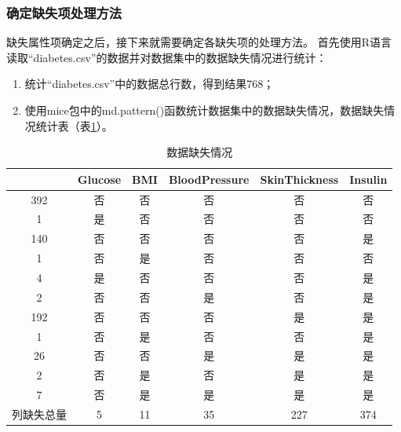 \documentclass[a4paper]{ctexart}
\begin{document}
\subsubsection{确定缺失项处理方法}\label{sec:确定缺失项处理方法}
缺失属性项确定之后，接下来就需要确定各缺失项的处理方法。
首先使用R语言读取“diabetes.csv”的数据并对数据集中的数据缺失情况进行统计：
\begin{enumerate}
	\item 统计“diabetes.csv”中的数据总行数，得到结果768；
	\item 使用mice包中的md.pattern()函数统计数据集中的数据缺失情况，数据缺失情况统计表（表\ref{tab:缺失数据统计}）。
\end{enumerate}
\begin{table}[htbp]
	\centering
	\caption{数据缺失情况}
	\begin{tabular}{|c|ccccc|}
		\hline
		\diagbox{数据点数量}{是否缺失}{列名} & Glucose & BMI & BloodPressure & SkinThickness & Insulin \\\hline
		392                                  & 否      & 否  & 否            & 否            & 否      \\
		1                                    & 是      & 否  & 否            & 否            & 否      \\
		140                                  & 否      & 否  & 否            & 否            & 是      \\
		1                                    & 否      & 是  & 否            & 否            & 否      \\
		4                                    & 是      & 否  & 否            & 否            & 是      \\
		2                                    & 否      & 否  & 是            & 否            & 是      \\
		192                                  & 否      & 否  & 否            & 是            & 是      \\
		1                                    & 否      & 是  & 否            & 否            & 是      \\
		26                                   & 否      & 否  & 是            & 是            & 是      \\
		2                                    & 否      & 是  & 否            & 是            & 是      \\
		7                                    & 否      & 是  & 是            & 是            & 是      \\\hline
		列缺失总量                           & 5       & 11  & 35            & 227           & 374     \\\hline
	\end{tabular}
	\label{tab:缺失数据统计}
\end{table}
\end{document}
